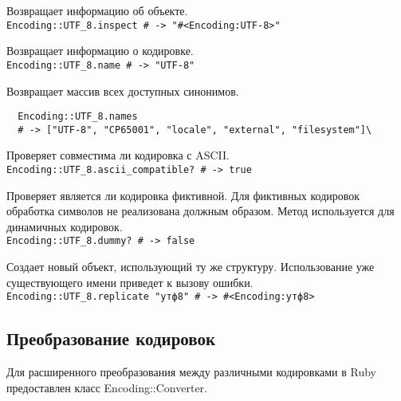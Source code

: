 \begin{methodlist}
  Возвращает информацию об объекте. 
  \\\verb!Encoding::UTF_8.inspect # -> "#<Encoding:UTF-8>"!
 
  Возвращает информацию о кодировке. 
  \\\verb!Encoding::UTF_8.name # -> "UTF-8"!
 
  Возвращает массив всех доступных синонимов.
  \begin{verbatim}
  Encoding::UTF_8.names 
  # -> ["UTF-8", "CP65001", "locale", "external", "filesystem"]\
  \end{verbatim}  
 
  Проверяет совместима ли кодировка с ASCII. 
  \\\verb!Encoding::UTF_8.ascii_compatible? # -> true!
 
  Проверяет является ли кодировка фиктивной. Для фиктивных кодировок обработка символов не реализована должным образом. Метод используется для динамичных кодировок. 
  \\\verb!Encoding::UTF_8.dummy? # -> false!

  Создает новый объект, использующий ту же структуру. Использование уже существующего имени приведет к вызову ошибки.
  \\\verb!Encoding::UTF_8.replicate "утф8" # -> #<Encoding:утф8>!
\end{methodlist}

\subsection{Преобразование кодировок}

Для расширенного преобразования между различными кодировками в Ruby предоставлен класс Encoding::Converter.

